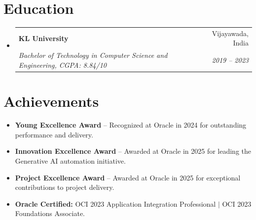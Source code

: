 \documentclass[letterpaper,11pt]{article}
\makeatletter
\newcommand{\resumeItem}[1]{
  \item\small{
    {#1 \vspace{-2pt}}
  }
}
\newcommand{\resumeSubheading}[4]{
  \vspace{-2pt}\item
    \begin{tabular*}{0.97\textwidth}[t]{l@{\extracolsep{\fill}}r}
      \textbf{#1} & #2 \\
      \textit{\small#3} & \textit{\small #4} \\
    \end{tabular*}\vspace{-7pt}
}
\newcommand{\resumeSubHeadingListStart}{\begin{itemize}[leftmargin=0.15in, label={}]}
\newcommand{\resumeSubHeadingListEnd}{\end{itemize}}
\newcommand{\resumeItemListStart}{\begin{itemize}}
\newcommand{\resumeItemListEnd}{\end{itemize}\vspace{-5pt}}
\makeatother
\begin{document}
\section{Education}
\resumeSubHeadingListStart
    \resumeSubheading
        {KL University}{Vijayawada, India}
        {Bachelor of Technology in Computer Science and Engineering, CGPA: 8.84/10}{2019 -- 2023}
\resumeSubHeadingListEnd

\section{Achievements}
\resumeItemListStart
    \resumeItem{\textbf{Young Excellence Award} -- Recognized at Oracle in 2024 for outstanding performance and delivery.}
    \resumeItem{\textbf{Innovation Excellence Award} -- Awarded at Oracle in 2025 for leading the Generative AI automation initiative.}
    \resumeItem{\textbf{Project Excellence Award} -- Awarded at Oracle in 2025 for exceptional contributions to project delivery.}
    \resumeItem{\textbf{Oracle Certified:} OCI 2023 Application Integration Professional $|$ OCI 2023 Foundations Associate.}
\resumeItemListEnd
\end{document}
